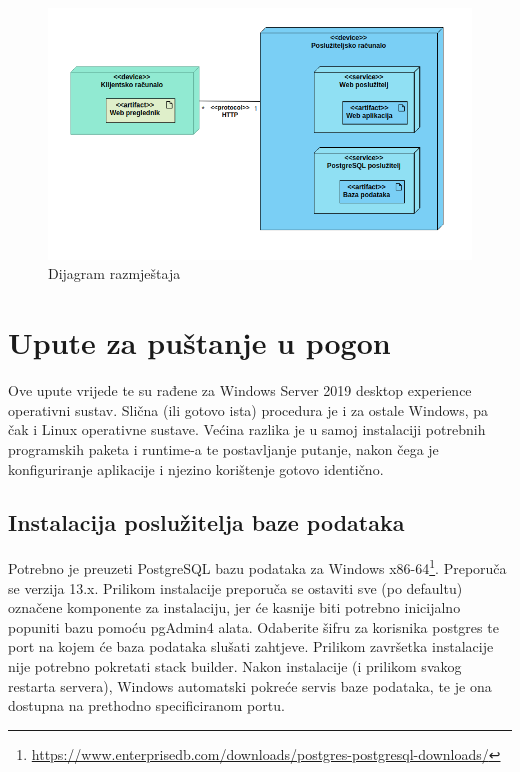 \begin{figure}[H]
	\centering
	\includegraphics[width=\textwidth, scale=0.5]{dijagrami/dijagram_razmjestaja}
	\caption{Dijagram razmještaja}
	\label{fig:dijagram_razmještaja}
\end{figure}
\eject
	
			
		
		\section{Upute za puštanje u pogon}
		
		Ove upute vrijede te su rađene za Windows Server 2019 desktop experience operativni sustav. Slična (ili gotovo ista) procedura je i za ostale Windows, pa čak i Linux operativne sustave. Većina razlika je u samoj instalaciji potrebnih programskih paketa i runtime-a te postavljanje putanje, nakon čega je konfiguriranje aplikacije i njezino korištenje gotovo identično.
		
			\subsection{Instalacija poslužitelja baze podataka}
			Potrebno je preuzeti {PostgreSQL bazu podataka za Windows x86-64}\footnote{\url{https://www.enterprisedb.com/downloads/postgres-postgresql-downloads/}}. Preporuča se verzija 13.x. Prilikom instalacije preporuča se ostaviti sve (po defaultu) označene komponente za instalaciju, jer će kasnije biti potrebno inicijalno popuniti bazu pomoću pgAdmin4 alata. Odaberite šifru za korisnika postgres te port na kojem će baza podataka slušati zahtjeve. Prilikom završetka instalacije nije potrebno pokretati stack builder. Nakon instalacije (i prilikom svakog restarta servera), Windows automatski pokreće servis baze podataka, te je ona dostupna na prethodno specificiranom portu.
			

